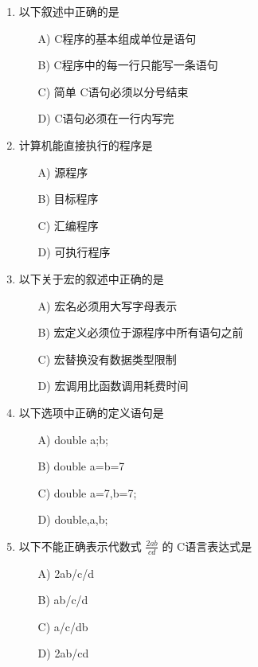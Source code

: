 \documentclass[12pt,a4paper]{article}
\begin{document}
\begin{enumerate}
    \item 以下叙述中正确的是
    \begin{enumerate}
        \item[A)] C程序的基本组成单位是语句
        \item[B)] C程序中的每一行只能写一条语句
        \item[C)] 简单 C语句必须以分号结束
        \item[D)] C语句必须在一行内写完
    \end{enumerate}
    
    \item 计算机能直接执行的程序是
    \begin{enumerate}
        \item[A)] 源程序
        \item[B)] 目标程序
        \item[C)] 汇编程序
        \item[D)] 可执行程序
    \end{enumerate}
    
    \item 以下关于宏的叙述中正确的是
    \begin{enumerate}
        \item[A)] 宏名必须用大写字母表示
        \item[B)] 宏定义必须位于源程序中所有语句之前
        \item[C)] 宏替换没有数据类型限制
        \item[D)] 宏调用比函数调用耗费时间
    \end{enumerate}
    
    \item 以下选项中正确的定义语句是
    \begin{enumerate}
        \item[A)] double a;b;
        \item[B)] double a=b=7
        \item[C)] double a=7,b=7;
        \item[D)] double,a,b;
    \end{enumerate}
    
    \item 以下不能正确表示代数式 $\frac{2ab}{cd}$ 的 C语言表达式是
    \begin{enumerate}
        \item[A)] 2\*a\*b/c/d
        \item[B)] a\*b/c/d
        \item[C)] a/c/d\*b
        \item[D)] 2\*a\*b/c\*d
    \end{enumerate}
    

\end{enumerate}
\end{document}
